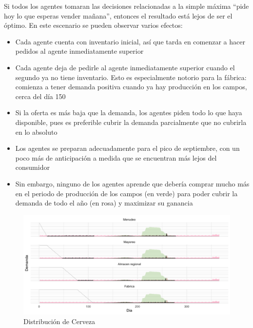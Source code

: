 Si todos los agentes tomaran las decisiones relacionadas a la simple m\'axima ``pide hoy lo que esperas vender ma\~nana'', entonces el resultado est\'a lejos de ser el \'optimo.
En este escenario se pueden observar varios efectos: 
\begin{itemize}
    \item Cada agente cuenta con inventario inicial, as\'i que tarda en comenzar a hacer pedidos al agente inmediatamente superior
    \item Cada agente deja de pedirle al agente inmediatamente superior cuando el segundo ya no tiene inventario. Esto es especialmente notorio para la f\'abrica: comienza a tener demanda positiva cuando ya hay producci\'on en los campos, cerca del d\'ia 150
    \item Si la oferta es m\'as baja que la demanda, los agentes piden todo lo que haya disponible, pues es preferible cubrir la demanda parcialmente que no cubrirla en lo absoluto
    \item Los agentes se preparan adecuadamente para el pico de septiembre, con un poco m\'as de anticipaci\'on a medida que se encuentran m\'as lejos del consumidor
    \item Sin embargo, ninguno de los agentes aprende que deber\'ia comprar mucho m\'as en el periodo de producci\'on de los campos (en verde) para poder cubrir la demanda de todo el a\~no (en rosa) y maximizar su ganancia
\end{itemize}

\begin{figure}[h!]
\caption{Distribuci\'on de Cerveza}
\label{analytic_3}
\includegraphics[width=16cm]{tesis_tex/figs/analytic_with_fields_restriction.png}
\centering
\end{figure}

